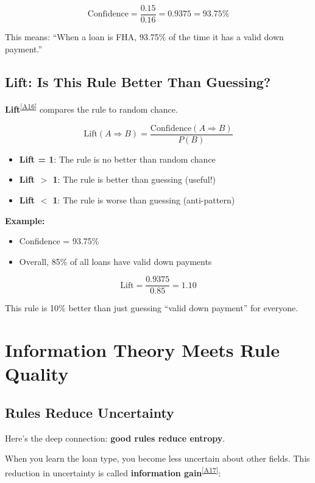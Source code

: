 \documentclass[11pt,a4paper]{article}
\newcommand{\term}[2]{\textcolor{termcolor}{\textbf{#1}}\textsuperscript{\hyperref[#2]{[#2]}}}
\begin{document}
\[
\text{Confidence} = \frac{0.15}{0.16} = 0.9375 = 93.75\%
\]

This means: ``When a loan is FHA, 93.75\% of the time it has a valid down payment.''

\subsection{Lift: Is This Rule Better Than Guessing?}

\term{Lift}{A16} compares the rule to random chance.

\begin{equation}
\text{Lift}(A \Rightarrow B) = \frac{\text{Confidence}(A \Rightarrow B)}{P(B)}
\end{equation}

\begin{itemize}
    \item \textbf{Lift = 1}: The rule is no better than random chance
    \item \textbf{Lift $>$ 1}: The rule is better than guessing (useful!)
    \item \textbf{Lift $<$ 1}: The rule is worse than guessing (anti-pattern)
\end{itemize}

\textbf{Example:}
\begin{itemize}
    \item Confidence = 93.75\%
    \item Overall, 85\% of all loans have valid down payments
\end{itemize}

\[
\text{Lift} = \frac{0.9375}{0.85} = 1.10
\]

This rule is 10\% better than just guessing ``valid down payment'' for everyone.

\section{Information Theory Meets Rule Quality}

\subsection{Rules Reduce Uncertainty}

Here's the deep connection: \textbf{good rules reduce entropy}.

When you learn the loan type, you become less uncertain about other fields. This reduction in uncertainty is called \term{information gain}{A17}:
\end{document}
